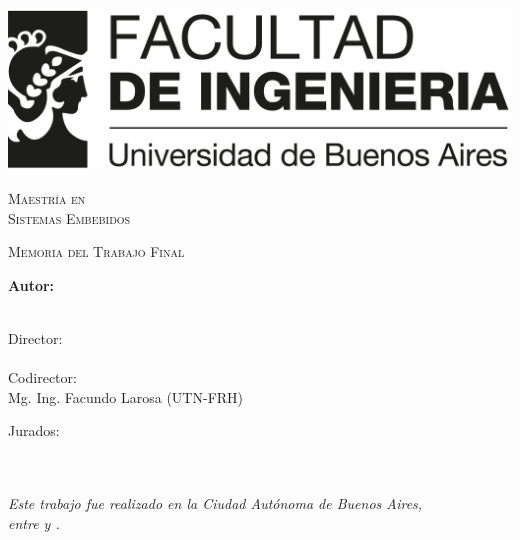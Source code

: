 \documentclass[
11pt, %
spanish,
singlespacing, %
parskip, %
headsepline, %
]{MastersDoctoralThesis} %
\author{Esp. Ing. Martín Nicolás Menéndez} %
\begin{document}
\frontmatter %

\pagestyle{plain} %


\begin{titlepage}
\begin{center}


\includegraphics[width=.8\textwidth]{./Figures/logoFIUBA.png}
\vspace{2cm}

\textsc{\huge{Maestría en\\ \vspace{5px} Sistemas Embebidos}}
\vspace{.5cm} %

\textsc{\Large Memoria del Trabajo Final}\\[1cm] %
{\huge \bfseries \ttitle\par}\vspace{0.4cm} %

\vfill

\vspace{0.8cm}
\LARGE\textbf{Autor:\\
\authorname}\\ %

\vspace{1.5cm}

\large
{Director:} \\
{\supname}\\ %
{Codirector:} \\
{Mg. Ing. Facundo Larosa (UTN-FRH)} %
 
\vspace{1cm}
Jurados:\\	
\jurunoname\\
\jurdosname\\
\jurtresname

\vspace{2cm}

\textit{Este trabajo fue realizado en la Ciudad Autónoma de Buenos Aires,\\ entre \fechaINICIOname \hspace{1px} y \fechaFINALname.}
\end{center}
\end{titlepage}
\end{document}
